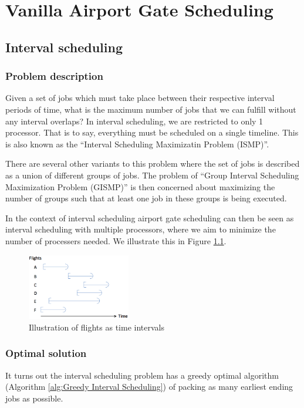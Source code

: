 \documentclass[12pt, a4paper]{report}
\begin{document}
\chapter{Vanilla Airport Gate Scheduling}
\section{Interval scheduling}
\subsection{Problem description}
Given a set of jobs which must take place between their respective interval periods of time, what is the maximum number of jobs that we can fulfill without any interval overlaps? In interval scheduling, we are restricted to only 1 processor. That is to say, everything must be scheduled on a single timeline. This is also known as the ``Interval Scheduling Maximizatin Problem (ISMP)''.

There are several other variants to this problem where the set of jobs is described as a union of different groups of jobs. The problem of ``Group Interval Scheduling Maximization Problem (GISMP)'' is then concerned about maximizing the number of groups such that at least one job in these groups is being executed.

In the context of interval scheduling airport gate scheduling can then be seen as interval scheduling with multiple processors, where we aim to minimize the number of processers needed. We illustrate this in Figure \ref{fig:FlightsAsIntervals}.

\begin{figure}[h!]
\centering
\includegraphics[width=0.4\textwidth]{../figures/vanilla.png}
\caption{Illustration of flights as time intervals}
\label{fig:FlightsAsIntervals}
\end{figure}

\subsection{Optimal solution}
It turns out the interval scheduling problem has a greedy optimal algorithm (Algorithm \ref{alg:Greedy Interval Scheduling}) of packing as many earliest ending jobs as possible.
\end{document}
